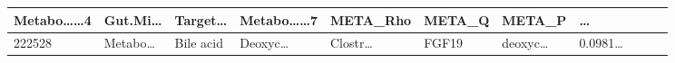 \documentclass[
]{article}
\begin{document}
\begin{longtable}[]{@{}lllllllllll@{}}
\begin{minipage}[b]{0.09\columnwidth}
Metabo\ldots\ldots4\strut
\end{minipage} & \begin{minipage}[b]{0.07\columnwidth}\raggedright
Gut.Mi\ldots{}\strut
\end{minipage} & \begin{minipage}[b]{0.07\columnwidth}\raggedright
Target\ldots{}\strut
\end{minipage} & \begin{minipage}[b]{0.09\columnwidth}\raggedright
Metabo\ldots\ldots7\strut
\end{minipage} & \begin{minipage}[b]{0.07\columnwidth}\raggedright
META\_Rho\strut
\end{minipage} & \begin{minipage}[b]{0.07\columnwidth}\raggedright
META\_Q\strut
\end{minipage} & \begin{minipage}[b]{0.07\columnwidth}\raggedright
META\_P\strut
\end{minipage} & \begin{minipage}[b]{0.03\columnwidth}\raggedright
\ldots{}\strut
\end{minipage}\tabularnewline
\midrule
\endhead
\begin{minipage}[t]{0.05\columnwidth}\raggedright
222528\strut
\end{minipage} & \begin{minipage}[t]{0.07\columnwidth}\raggedright
Metabo\ldots{}\strut
\end{minipage} & \begin{minipage}[t]{0.07\columnwidth}\raggedright
Bile acid\strut
\end{minipage} & \begin{minipage}[t]{0.09\columnwidth}\raggedright
Deoxyc\ldots{}\strut
\end{minipage} & \begin{minipage}[t]{0.07\columnwidth}\raggedright
Clostr\ldots{}\strut
\end{minipage} & \begin{minipage}[t]{0.07\columnwidth}\raggedright
FGF19\strut
\end{minipage} & \begin{minipage}[t]{0.09\columnwidth}\raggedright
deoxyc\ldots{}\strut
\end{minipage} & \begin{minipage}[t]{0.07\columnwidth}\raggedright
0.0981\ldots{}\strut
\end{minipage} & \begin{minipage}[t]{0.07\columnwidth}\raggedright

\end{minipage}
\end{longtable}
\end{document}
